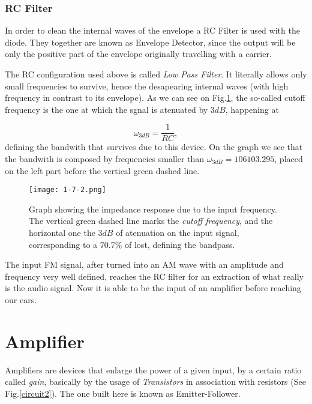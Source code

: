 \documentclass{article}
\begin{document}
\subsubsection{RC Filter}

In order to clean the internal waves of the envelope a RC Filter is
used with the diode. They together are known as Envelope
Detector, since the output will be only the positive part of the
envelope originally travelling with a carrier. 

The RC configuration used above is called \emph{Low Pass Filter}. It
literally allows only small frequencies to survive, hence the
desapearing internal waves (with high frequency in contrast to its
envelope). As we can see on Fig.\ref{lastfilter}, the so-called cutoff
frequency is the one at which the sgnal is atenuated by $3dB$, happening
at 

\begin{equation}
\omega_{3dB}=\frac{1}{RC},
\label{eq:1}
\end{equation}
defining the bandwith that survives due to this device. On the graph we
see that the bandwith is composed by frequencies smaller than
$\omega_{3dB}=106103.295$, placed on the left part before the vertical
green dashed line.

\begin{figure}[H]
\center
\texttt{[image: 1-7-2.png]}
\caption {Graph showing the impedance response due to the input
  frequency. The vertical green dashed line marks the \emph{cutoff
   frequency}, and the horizontal one the $3dB$ of atenuation on the
 input signal, corresponding to a $70.7\%$ of lost, defining the bandpass.}
\label{lastfilter}
\end{figure}

The input FM signal, after turned into an AM wave with an amplitude and
frequency very well defined, reaches the RC filter for an extraction of
what really is the audio signal. Now it is able to be the input of an
amplifier before reaching our ears. 

\section{Amplifier}

Amplifiers are devices that enlarge the power of a given input, by a
certain ratio called \emph{gain}, basically by the usage of
\emph{Transistors} in association with resistors (See
Fig.\ref{circuit2}). The one built here is known as Emitter-Follower.
\end{document}
